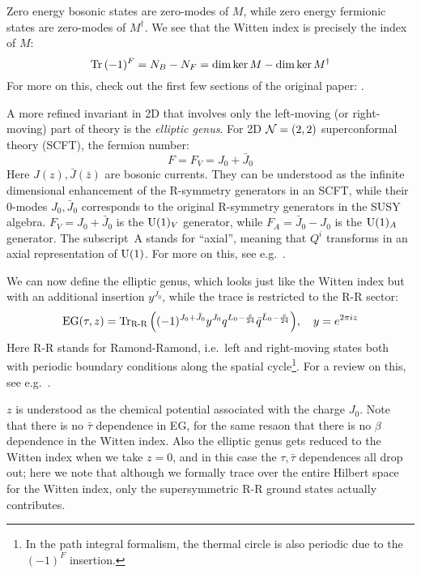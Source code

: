 \documentclass[a4paper
	,10pt
]{article}
\begin{document}
	Zero energy bosonic states are zero-modes of $M$, while zero energy fermionic states are zero-modes of $M^\dagger$. We see that the Witten index is precisely the index of $M$:
	\begin{equation}
		\Tr\,(-1)^F
		= N_B - N_F
		= \dim \ker M - \dim \ker M^\dagger
	\end{equation}
	For more on this, check out the first few sections of the original paper: \textcite{Witten:1982df}. 
	
	\newparagraph
	A more refined invariant in 2D that involves only the left-moving (or right-moving) part of theory is the \textit{elliptic genus}. For 2D $\mathcal{N} = (2,2)$ superconformal theory (SCFT), the fermion number:
	\begin{equation}
		F = F_V = J_0 + \bar{J}_0
	\end{equation}
	Here $J(z),\bar{J}(\bar{z})$ are bosonic currents. They can be understood as the infinite dimensional enhancement of the R-symmetry generators in an SCFT, while their 0-modes $J_0,\bar{J}_0$ corresponds to the original R-symmetry generators in the SUSY algebra. $F_V = J_0 + \bar{J}_0$ is the $\mathrm{U}(1)_V$ generator, while $F_A = \bar{J}_0 - J_0$ is the $\mathrm{U}(1)_A$ generator. The \mbox{subscript A} stands for ``axial'', meaning that $Q^i$ transforms in an axial representation of $\mathrm{U}(1)$. For more on this, see e.g.~\cite{MauricioStuff}. 
	
	We can now define the elliptic genus, which looks just like the Witten index but with an additional insertion $y^{J_0}$, while the trace is restricted to the R-R sector:
	\begin{equation}
		\mrm{EG}(\tau,z)
		= \Tr_{\text{R-R}} \pqty{
			(-1)^{J_0 + \bar{J}_0}
			y^{J_0}
			q^{L_0 - \frac{c}{24}}
			\bar{q}^{\bar{L}_0 - \frac{c}{24}}
		}, \quad y = e^{2\pi i z}
	\end{equation}
	Here R-R stands for Ramond-Ramond, i.e.\ left and right-moving states both with periodic boundary conditions along the spatial cycle\footnote{
		In the path integral formalism, the thermal circle is also periodic due to the $(-1)^F$ insertion. 
	}. 
	For a review on this, see e.g.~\cite{Anagiannis:2018jqf}. 
	
	$z$ is understood as the chemical potential associated with the charge $J_0$. Note that there is no $\bar{\tau}$ dependence in EG, for the same resaon that there is no $\beta$ dependence in the Witten index. Also the elliptic genus gets reduced to the Witten index when we take $z = 0$, and in this case the $\tau,\bar{\tau}$ dependences all drop out; here we note that although we formally trace over the entire Hilbert space for the Witten index, only the supersymmetric R-R ground states actually contributes. 
	
\end{document}
